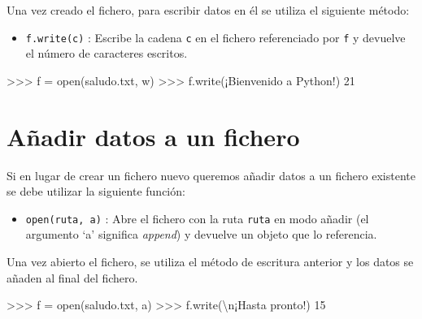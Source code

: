 \documentclass[
  spanish,
  a4paper,
]{scrreport}
\newenvironment{Shaded}{\begin{snugshade}}{\end{snugshade}}
\newcommand{\BuiltInTok}[1]{\textcolor[rgb]{0.00,0.23,0.31}{#1}}
\newcommand{\CharTok}[1]{\textcolor[rgb]{0.13,0.47,0.30}{#1}}
\newcommand{\DecValTok}[1]{\textcolor[rgb]{0.68,0.00,0.00}{#1}}
\newcommand{\NormalTok}[1]{\textcolor[rgb]{0.00,0.23,0.31}{#1}}
\newcommand{\OperatorTok}[1]{\textcolor[rgb]{0.37,0.37,0.37}{#1}}
\newcommand{\StringTok}[1]{\textcolor[rgb]{0.13,0.47,0.30}{#1}}
\providecommand{\tightlist}{%
  \setlength{\itemsep}{0pt}\setlength{\parskip}{0pt}}
\begin{document}
Una vez creado el fichero, para escribir datos en él se utiliza el
siguiente método:

\begin{itemize}
\tightlist
\item
  \texttt{f.write(c)} : Escribe la cadena \texttt{c} en el fichero
  referenciado por \texttt{f} y devuelve el número de caracteres
  escritos.
\end{itemize}

\begin{Shaded}
\begin{Highlighting}[]
\OperatorTok{\textgreater{}\textgreater{}\textgreater{}}\NormalTok{ f }\OperatorTok{=} \BuiltInTok{open}\NormalTok{(}\StringTok{\textquotesingle{}saludo.txt\textquotesingle{}}\NormalTok{, }\StringTok{\textquotesingle{}w\textquotesingle{}}\NormalTok{)}
\OperatorTok{\textgreater{}\textgreater{}\textgreater{}}\NormalTok{ f.write(}\StringTok{\textquotesingle{}¡Bienvenido a Python!\textquotesingle{}}\NormalTok{)}
\DecValTok{21}
\end{Highlighting}
\end{Shaded}

\section{Añadir datos a un fichero}\label{auxf1adir-datos-a-un-fichero}

Si en lugar de crear un fichero nuevo queremos añadir datos a un fichero
existente se debe utilizar la siguiente función:

\begin{itemize}
\tightlist
\item
  \texttt{open(ruta,\ \textquotesingle{}a\textquotesingle{})} : Abre el
  fichero con la ruta \texttt{ruta} en modo añadir (el argumento `a'
  significa \emph{append}) y devuelve un objeto que lo referencia.
\end{itemize}

Una vez abierto el fichero, se utiliza el método de escritura anterior y
los datos se añaden al final del fichero.

\begin{Shaded}
\begin{Highlighting}[]
\OperatorTok{\textgreater{}\textgreater{}\textgreater{}}\NormalTok{ f }\OperatorTok{=} \BuiltInTok{open}\NormalTok{(}\StringTok{\textquotesingle{}saludo.txt\textquotesingle{}}\NormalTok{, }\StringTok{\textquotesingle{}a\textquotesingle{}}\NormalTok{)}
\OperatorTok{\textgreater{}\textgreater{}\textgreater{}}\NormalTok{ f.write(}\StringTok{\textquotesingle{}}\CharTok{\textbackslash{}n}\StringTok{¡Hasta pronto!\textquotesingle{}}\NormalTok{)}
\DecValTok{15}
\end{Highlighting}
\end{Shaded}
\end{document}
